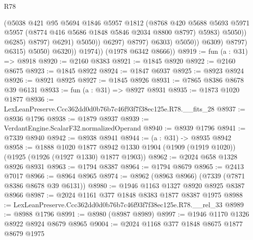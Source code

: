 \begin{lexlean}{R78}
\begin{coremodule}
                                            (@5038
                                              @421
                                              @95
                                              @5694
                                              @1846
                                              @5957
                                              @1812
                                              (@8768
                                                @420
                                                @5688
                                                @5693
                                                @5971
                                                @5957
                                                (@8774 @416 @5686 @1848 @5846 @2034 @8800 @8797)
                                                @5983)
                                              @5050))
                                          @6285)
                                        @8797)
                                      @6291)
                                    @5050))
                                @6297)
                              @8797)
                            @6303)
                          @5050))
                      @6309)
                    @8797)
                  @6315)
                @5050)
              @6320))
          @1974))
      (@1978 @6342 @8666))
@8919 := fun (a : @31) => @8918
@8920 := @2160 @8383
@8921 := @1845 @8920
@8922 := @2160 @8675
@8923 := @1845 @8922
@8924 := @1847 @6937
@8925 := @8923 @8924
@8926 := @8921 @8925
@8927 := @1845 @8926
@8931 := @7865 @8386 @8678 @39 @6131
@8933 := fun (a : @31) => @8927 @8931
@8935 := @1873 @1020 @1877
@8936 := LexLeanPreserve.Ccc362dd0d0b76b7c46f93f7f38ec125e.R78.__fits_28
@8937 := @8936 @1796
@8938 := @1879 @8937
@8939 := VerdantEngine.ScalarF32.normalizedOperand
@8940 := @8939 @1796
@8941 := @7339 @8940
@8942 := @8938 @8941
@8944 := (a : @31) -> @8935 @8942
@8958 := @1888
    @1020
    @1877
    @8942
    @1330
    @1904
    (@1909 (@1919 @1020))
    (@1925 (@1926 (@1927 @1330) @1877 @1903))
@8962 := @2024 @658 @1328 @8926 @8931
@8963 := @1794 @8387
@8964 := @1794 @8679
@8965 := @2413 @7017
@8966 := @8964 @8965
@8974 := @8962 (@8963 @8966) (@7339 (@7871 @8386 @8678 @39 @6131))
@8980 := @1946 @1163 @1327 @8920 @8925 @8387 @8966
@8987 := @2024 @1161 @377 @1848 @8383 @1877 @8387 @1975
@8988 := LexLeanPreserve.Ccc362dd0d0b76b7c46f93f7f38ec125e.R78.__rel_33
@8989 := @8988 @1796
@8991 := @8980 (@8987 @8989)
@8997 := @1946 @1170 @1326 @8922 @8924 @8679 @8965
@9004 := @2024 @1168 @377 @1848 @8675 @1877 @8679 @1975

\end{coremodule}
\end{lexlean}
